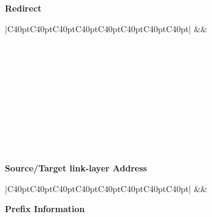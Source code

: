 \documentclass[12pt]{article}
\begin{document}
\textbf{Redirect}
\begin{savenotes}
\begin{table}[!htpb]
\centering
\begin{tabular}{|C{40pt}C{40pt}C{40pt}C{40pt}C{40pt}C{40pt}C{40pt}C{40pt}|}
\hline
{}&&\\
\hline
{}\\
\hline
{}
\\
\\
\\
\\
\hline
{}
\\
\\
\\
\\
\hline
{}
\\
\hdashline
\end{tabular}
\caption{Redirect}
\label{table:redirect}
\end{table}
\end{savenotes}


\textbf{Source/Target link-layer Address}
\vspace{20pt}
\begin{savenotes}
\begin{table}[!htpb]
\centering
\begin{tabular}{|C{40pt}C{40pt}C{40pt}C{40pt}C{40pt}C{40pt}C{40pt}C{40pt}|}
\hline
{}&&\\
\hline
\end{tabular}
\caption{Source/Target link-layer Address}
\label{table:optionsSrcTgt}
\end{table}
\end{savenotes}

\textbf{Prefix Information}
\end{document}
